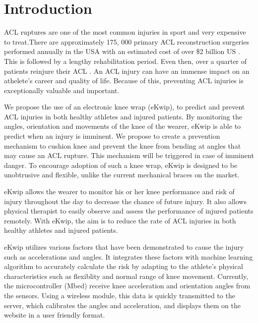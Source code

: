 \documentclass{sig-alternate}
\begin{document}
\section{Introduction}
\label{sec:intro}
ACL ruptures are one of the most common injuries in sport and very expensive to treat.There are approximately 175, 000 primary ACL reconstruction surgeries performed annually in the USA with an estimated cost of over \$2 billion US \cite{yu2007mechanisms}. This is followed by a lengthy rehabilitation period. Even then, over a quarter of patients reinjure their ACL \cite{stevenson1998gender}. An ACL injury can have an immense impact on an athelete's career and quality of life. Because of this, preventing ACL injuries is exceptionally valuable and important.

We propose the use of an electronic knee wrap (eKwip), to predict and prevent ACL injuries in both healthy athletes and injured patients. By monitoring the angles, orientation and movements of the knee of the wearer, eKwip is able to predict when an injury is imminent. We propose to create a prevention mechanism to cushion knee and prevent the knee from bending at angles that may cause an ACL rupture. This mechanism will be triggered in case of imminent danger. To encourage adoption of such a knee wrap, eKwip is designed to be unobtrusive and flexible, unlike the current mechanical braces on the market.

eKwip allows the wearer to monitor his or her knee performance and risk of injury throughout the day to decrease the chance of future injury. It also allows physical therapist to easily observe and assess the performance of injured patients remotely. With eKwip, the aim is to reduce the rate of ACL injuries in both healthy athletes and injured patients.

eKwip utilizes various factors that have been demonstrated to cause the injury such as accelerations and angles. It integrates these factors with machine learning algorithm to accurately calculate the risk by adapting to the athlete's physical characteristics such as flexiblity and normal range of knee movement. Currently, the microcontroller (Mbed) receive knee acceleration and orientation angles from the sensors. Using a wireless module, this data is quickly transmitted to the server, which calibrates the angles and acceleration, and displays them on the website in a user friendly format.
\end{document}
